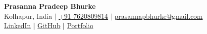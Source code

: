 \documentclass[letterpaper,10pt]{article}
\begin{document}
\begin{center}
    {\Huge \bfseries Prasanna Pradeep Bhurke} \\[3pt]
    Kolhapur, India \quad $|$ \quad \href{tel:+917620809814}{+91 7620809814} \quad $|$ \quad \href{mailto:prasannapbhurke@gmail.com}{prasannapbhurke@gmail.com} \\[2pt]
    \href{https://www.linkedin.com/in/prasanna-bhurke-25a10931a}{LinkedIn} \quad $|$ \quad \href{https://github.com/prasannapbhurke}{GitHub} \quad $|$ \quad \href{https://prasannapbhurke.github.io/prasannapbhurke/}{Portfolio}
\end{center}

\vspace{-6pt}
\end{document}
